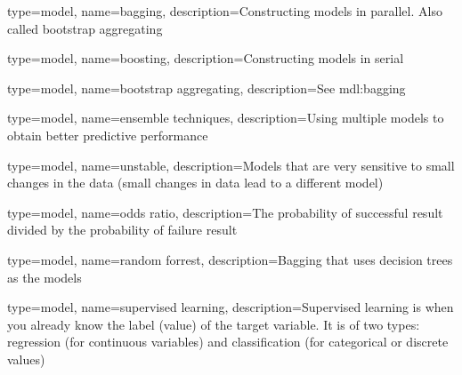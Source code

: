 

{
	type=model,
    name=bagging,
    description={Constructing models in parallel.  Also called bootstrap aggregating}
}

{
	type=model,
    name=boosting,
    description={Constructing models in serial}
}

{
	type=model,
    name=bootstrap aggregating,
    description={See \gls{mdl:bagging}}
}

{
	type=model,
    name=ensemble techniques,
    description={Using multiple models to obtain better predictive performance}
}

{
	type=model,
    name=unstable,
    description={Models that are very sensitive to small changes in the data (small changes in data lead to a different model)}
}

{
	type=model,
    name=odds ratio,
    description={The probability of successful result divided by the probability of failure result}
}

{
	type=model,
    name=random forrest,
    description={Bagging that uses decision trees as the models}
}

{
	type=model,
    name=supervised learning,
    description={Supervised learning is when you already know the label (value) of the target variable. It is of two types: regression (for continuous variables) and classification (for categorical or discrete values)}
} 